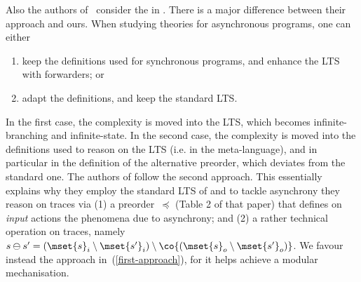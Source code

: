 Also the authors of~\cite{DBLP:journals/iandc/BorealeNP02}
consider the \mustpreorder in \ACCS.
There is a major difference between their approach and ours.
When studying theories for asynchronous programs, one can either
\begin{enumerate}[(1)]
  \item \label{first-approach} keep the definitions used for synchronous programs,
    and enhance the LTS with forwarders;
    or
  \item adapt the definitions, and keep the standard LTS.
\end{enumerate}
In the first case, the complexity is moved into the LTS, which
becomes infinite-branching and infinite-state.
In the second case, the complexity is moved into the definitions
used to reason on the LTS (i.e. in the meta-language), and in
particular in the definition of the alternative preorder, which
deviates from the standard one. The authors of
\cite{DBLP:journals/iandc/BorealeNP02} follow the second approach. %
This essentially explains why they employ the standard LTS of \CCS
and to tackle asynchrony they reason on traces via (1) a preorder~$\preceq$ (Table 2 of that paper) that defines on {\em input} actions
the phenomena due to asynchrony; and (2)
a rather technical operation on traces, namely %
  $s \ominus s' = ( \mset{s}_{i} \setminus
  \mset{s'}_{i}) \setminus \co{( \mset{s}_{o} \setminus  \mset{s'}_{o}
    )}$.
We favour instead the approach in~(\ref{first-approach}), for %
it helps %
achieve a modular mechanisation.

